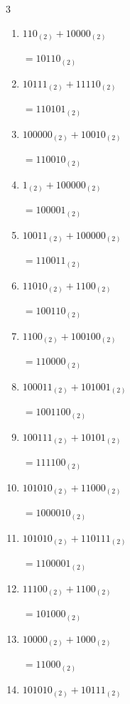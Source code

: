 \begin{multicols}{3}
\begin{enumerate}
        $=101110_{(2)}$

  \item $110_{(2)} + 10000_{(2)}$

        $=10110_{(2)}$

  \item $10111_{(2)} + 11110_{(2)}$

        $=110101_{(2)}$

  \item $100000_{(2)} + 10010_{(2)}$

        $=110010_{(2)}$

  \item $1_{(2)} + 100000_{(2)}$

        $=100001_{(2)}$

  \item $10011_{(2)} + 100000_{(2)}$

        $=110011_{(2)}$

  \item $11010_{(2)} + 1100_{(2)}$

        $=100110_{(2)}$

  \item $1100_{(2)} + 100100_{(2)}$

        $=110000_{(2)}$

\columnbreak %

\resetques

  \item $100011_{(2)} + 101001_{(2)}$

        $=1001100_{(2)}$

  \item $100111_{(2)} + 10101_{(2)}$

        $=111100_{(2)}$

  \item $101010_{(2)} + 11000_{(2)}$

        $=1000010_{(2)}$

  \item $101010_{(2)} + 110111_{(2)}$

        $=1100001_{(2)}$

  \item $11100_{(2)} + 1100_{(2)}$

        $=101000_{(2)}$

  \item $10000_{(2)} + 1000_{(2)}$

        $=11000_{(2)}$

  \item $101010_{(2)} + 10111_{(2)}$


\end{enumerate}
\end{multicols}
